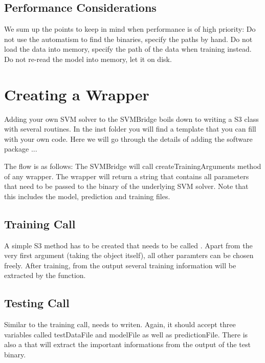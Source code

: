 \documentclass[article, shortnames]{jss}
\begin{document}
\subsection{Performance Considerations}

We sum up the points to keep in mind when performance is of high priority:
Do not use the automatism to find the binaries, specify the paths by hand.
Do not load the data into memory, specify the path of the data when training instead.
Do not re-read the model into memory, let it on disk.



\section{Creating a Wrapper}

Adding your own SVM solver to the SVMBridge boils down to
writing a S3 class with several routines. In the inst folder you will find
a template that you can fill with your own code. Here we will go
through the details of adding the software package ...

The flow is as follows: The SVMBridge will call 
createTrainingArguments method of any wrapper. The wrapper
will return a string that contains all parameters that need to be
passed to the binary of the underlying SVM solver. Note that
this includes the model, prediction and training files.



\subsection{Training Call}

A simple S3 method has to be created that needs to be called
. Apart from the very
first argument (taking the object itself), all other paramters
can be chosen freely. After training, from the output several
training information will be extracted by the 
 function. 


\subsection{Testing Call}

Similar to the training call,  needs to
writen. Again, it should accept three variables called testDataFile and
modelFile as well as predictionFile. There is also a
 that will extract the important informations
from the output of the test binary.
\end{document}
